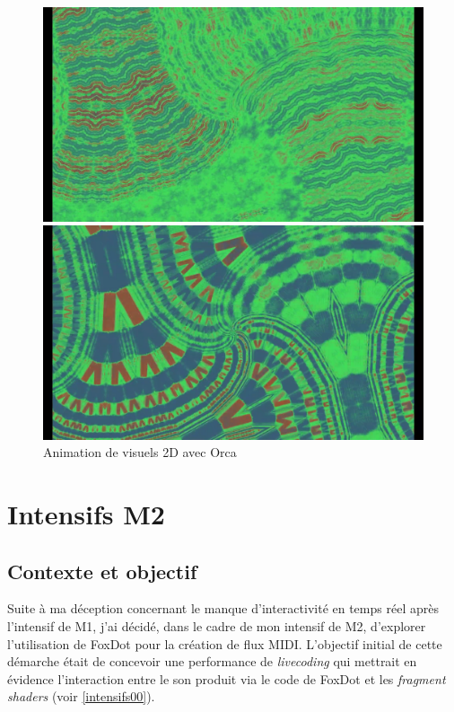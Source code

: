 \begin{figure}[h]
  \begin{minipage}[b]{0.45\linewidth}
    \centering
    \includegraphics[width=\linewidth]{images/experiments/orcatouch02.png}
  \end{minipage}
  \hspace{0.1\linewidth} %
  \begin{minipage}[b]{0.45\linewidth}
    \centering
    \includegraphics[width=\linewidth]{images/experiments/orcatouch03.png}
  \end{minipage}
  \caption{Animation de visuels 2D avec Orca}
  \label{orcatouch01}
\end{figure}



\newpage
\section{Intensifs M2}


\subsection*{Contexte et objectif}
Suite à ma déception concernant le manque d'interactivité en temps réel après l'intensif de M1, j'ai décidé, dans le cadre de mon intensif de M2, d'explorer l'utilisation de FoxDot pour la création de flux MIDI. L'objectif initial de cette démarche était de concevoir une performance de \textit{livecoding} qui mettrait en évidence l'interaction entre le son produit via le code de FoxDot et les \textit{fragment shaders} (voir \ref{intensifs00}).

